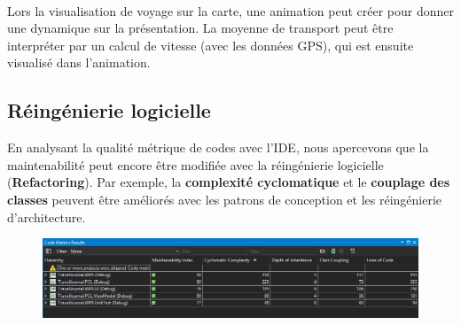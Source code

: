 \documentclass{article}
\begin{document}
\ \\Lors la visualisation de voyage sur la carte, une animation peut créer pour donner une dynamique sur la présentation. La moyenne de transport peut être interpréter par un calcul de vitesse (avec les données GPS), qui est ensuite visualisé dans l'animation.

\vspace{0.2 cm}
\subsection{\Large Réingénierie logicielle}
En analysant la qualité métrique de codes avec l'IDE, nous apercevons que la maintenabilité peut encore être modifiée avec la réingénierie logicielle (\textbf{Refactoring}).  Par exemple, la \textbf{complexité cyclomatique} et le \textbf{couplage des classes} peuvent être améliorés avec les patrons de conception et les réingénierie d'architecture. 

\begin{figure}[h!]
\centering
\includegraphics[width=150mm]{CODE.png}
\end{figure}


\newpage
\end{document}
